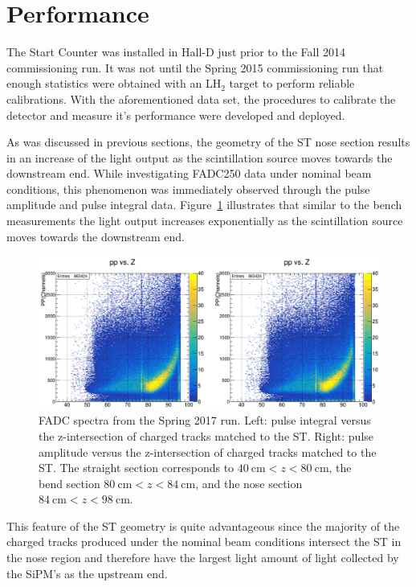 \section{Performance} \label{sec:perform}

The Start Counter was installed in Hall-D just prior to the Fall 2014 \gx{} commissioning run.  It was not until the Spring 2015 commissioning run that enough statistics were obtained with an $\mathrm{LH_{2}}$ target to perform reliable calibrations.  With the aforementioned data set, the procedures to calibrate the detector and measure it's performance were developed and deployed.

As was discussed in previous sections, the geometry of the ST nose section results in an increase of the light output as the scintillation source moves towards the downstream end.  While investigating FADC250 data under nominal beam conditions, this phenomenon was immediately observed through the pulse amplitude and pulse integral data. Figure~\ref{fig:pippvszint} illustrates that similar to the bench measurements the light output increases exponentially as the scintillation source moves towards the downstream end.
	\begin{figure}[!htb]
		\centering
		\includegraphics[width=1.0\columnwidth]{performance/figs/pi_pp_vs_zint}
		\caption{FADC spectra from the Spring 2017 run. Left: pulse integral versus the z-intersection of charged tracks matched to the ST. Right: pulse amplitude versus the z-intersection of charged tracks matched to the ST. The straight section corresponds to $40\ \mathrm{cm} < z < 80\ \mathrm{cm}$, the bend section $80\ \mathrm{cm} < z < 84\ \mathrm{cm}$, and the nose section $84\ \mathrm{cm} < z < 98\ \mathrm{cm}$.}
		\label{fig:pippvszint}
	\end{figure}
This feature of the ST geometry is quite advantageous since the majority of the charged tracks produced under the nominal \gx{} beam conditions intersect the ST in the nose region and therefore have the largest light amount of light collected by the SiPM's as the upstream end.

